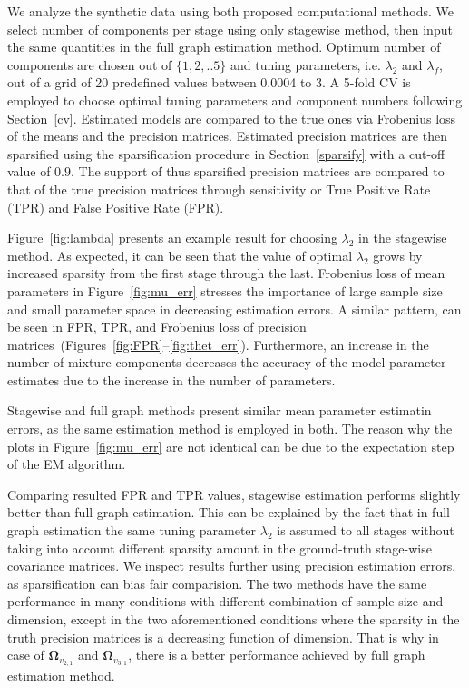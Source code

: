 \documentclass[10pt]{article}
\begin{document}
We analyze the synthetic data using both proposed computational methods. We select number of components per stage using only stagewise method, then input the same quantities in the full graph estimation method. Optimum number of components are chosen out of $\{1,2,..5\}$ and tuning parameters, i.e. $\lambda_2$ and $\lambda_f$, out of a grid of 20 predefined values between 0.0004 to 3. A 5-fold CV is employed to choose optimal tuning parameters and component numbers following Section~\ref{cv}. Estimated models are compared to the true ones via Frobenius loss of the means and the precision matrices. Estimated precision matrices are then sparsified using the sparsification procedure in Section~\ref{sparsify} with a cut-off value of $0.9$. The support of thus sparsified precision matrices are compared to that of the true precision matrices through sensitivity or True Positive Rate (TPR) and False Positive Rate (FPR).

Figure~\ref{fig:lambda} presents an example result for choosing $\lambda_2$ in the stagewise method. As expected, it can be seen that the value of optimal $\lambda_2$ grows by increased sparsity from the first stage through the last. Frobenius loss of mean parameters in Figure~\ref{fig:mu_err} stresses the importance of large sample size and small parameter space in decreasing estimation errors.  A similar pattern, can be seen in FPR, TPR, and Frobenius loss of precision matrices~(Figures~\ref{fig:FPR}--\ref{fig:thet_err}). Furthermore, an increase in the number of mixture components decreases the accuracy of the model parameter estimates due to the increase in the number of parameters.



Stagewise and full graph methods present similar mean parameter estimatin errors, as the same estimation method is employed in both. The reason why the plots in Figure~\ref{fig:mu_err} are not identical can be due to the expectation step of the EM algorithm. 


Comparing resulted FPR and TPR values, stagewise estimation performs slightly better than full graph estimation.  This can be explained by the fact that in full graph estimation the same tuning parameter $\lambda_2$ is assumed to all stages without taking into account different sparsity amount in the ground-truth stage-wise covariance matrices. We inspect results further using precision estimation errors, as sparsification can bias fair comparision. The two methods have the same performance in many conditions with different combination of sample size and dimension, except in the two aforementioned conditions where the sparsity in the truth precision matrices is a decreasing function of dimension. That is why in case of $\mathbf{\Omega}_{v_{2,1}}$ and $\mathbf{\Omega}_{v_{3,1}}$, there is a better performance achieved by full graph estimation method.
\end{document}
